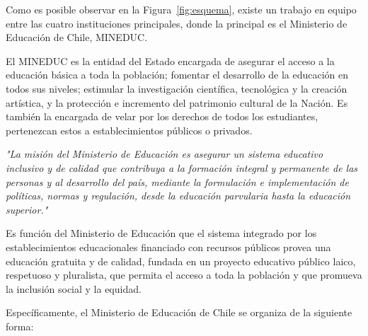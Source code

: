Como es posible observar en la Figura~\ref{fig:esquema}, existe un trabajo en equipo entre las cuatro instituciones principales, donde la principal es el Ministerio de Educación de Chile, MINEDUC.

El MINEDUC es la entidad del Estado encargada de asegurar el acceso a la educación básica a toda la población; fomentar el desarrollo de la educación en todos sus niveles; estimular la investigación científica, tecnológica y la creación artística, y la protección e incremento del patrimonio cultural de la Nación. Es también la encargada de velar por los derechos de todos los estudiantes, pertenezcan estos a establecimientos públicos o privados. 


\textit{"La misión del Ministerio de Educación es asegurar un sistema educativo inclusivo y de calidad que contribuya a la formación integral y permanente de las personas y al desarrollo del país, mediante la formulación e implementación de políticas, normas y regulación, desde la educación parvularia hasta la educación superior."} \cite{misionmineduc}

Es función del Ministerio de Educación que el sistema integrado por los establecimientos educacionales financiado con recursos públicos provea una educación gratuita y de calidad, fundada en un proyecto educativo público laico, respetuoso y pluralista, que permita el acceso a toda la población y que promueva la inclusión social y la equidad. 

Específicamente, el Ministerio de Educación de Chile se organiza de la siguiente forma\cite{orgmineduc}:

